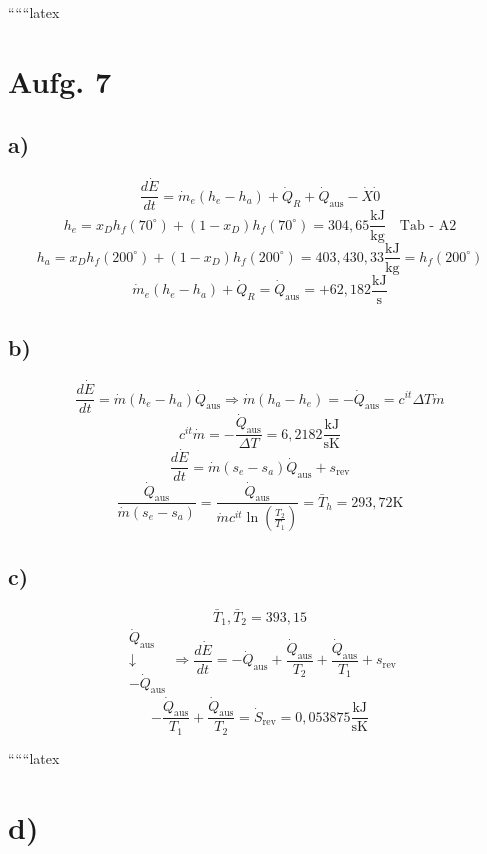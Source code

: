 
``````latex


\section*{Aufg. 7}

\subsection*{a)}
\[
\frac{d\dot{E}}{dt} = \dot{m}_e (h_e - h_a) + \dot{Q}_R + \dot{Q}_{\text{aus}} - \dot{X} \dot{0}
\]
\[
h_e = x_D h_f (70^\circ) + (1 - x_D) h_f (70^\circ) = 304,65 \frac{\text{kJ}}{\text{kg}} \quad \text{Tab - A2}
\]
\[
h_a = x_D h_f (200^\circ) + (1 - x_D) h_f (200^\circ) = 403,430,33 \frac{\text{kJ}}{\text{kg}} = h_f (200^\circ)
\]
\[
\dot{m}_e (h_e - h_a) + \dot{Q}_R = \dot{Q}_{\text{aus}} = + 62,182 \frac{\text{kJ}}{\text{s}}
\]

\subsection*{b)}
\[
\frac{d\dot{E}}{dt} = \dot{m} (h_e - h_a) \dot{Q}_{\text{aus}} \Rightarrow \dot{m} (h_a - h_e) = -\dot{Q}_{\text{aus}} = c^{it} \Delta T \dot{m}
\]
\[
c^{it} \dot{m} = -\frac{\dot{Q}_{\text{aus}}}{\Delta T} = 6,2182 \frac{\text{kJ}}{\text{sK}}
\]
\[
\frac{d\dot{E}}{dt} = \dot{m} (s_e - s_a) \dot{Q}_{\text{aus}} + s_{\text{rev}}
\]
\[
\frac{\dot{Q}_{\text{aus}}}{\dot{m} (s_e - s_a)} = \frac{\dot{Q}_{\text{aus}}}{\dot{m} c^{it} \ln \left( \frac{T_2}{T_1} \right)} = \bar{T}_h = 293,72 \text{K}
\]

\subsection*{c)}
\[
\bar{T}_1, \bar{T}_2 = 393,15
\]
\[
\begin{array}{c}
\dot{Q}_{\text{aus}} \\
\downarrow \\
-\dot{Q}_{\text{aus}}
\end{array}
\Rightarrow \frac{d\dot{E}}{dt} = -\dot{Q}_{\text{aus}} + \frac{\dot{Q}_{\text{aus}}}{T_2} + \frac{\dot{Q}_{\text{aus}}}{T_1} + s_{\text{rev}}
\]
\[
-\frac{\dot{Q}_{\text{aus}}}{T_1} + \frac{\dot{Q}_{\text{aus}}}{T_2} = \dot{S}_{\text{rev}} = 0,053875 \frac{\text{kJ}}{\text{sK}}
\]

``````latex


\section*{d)}

